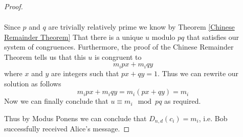 \begin{definition}
\begin{proof}
\begin{itemize}
\begin{align*}
                        \end{align*}
                        Since $p$ and $q$ are trivially relatively prime we know by Theorem
                        \ref{Chinese Remainder Theorem} That there is a unique $u$ modulo
                        $pq$ that satisfies our system of congruences. Furthermore, the proof
                        of the Chinese Remainder Theorem tells us that this $u$ is congruent to
                        \[
                            m_ipx + m_iqy
                        \]
                        where $x$ and $y$ are integers such that $px + qy = 1$. Thus we can
                        rewrite our solution as follows
                        \[
                            m_ipx + m_iqy = m_i(px + qy) = m_i
                        \]
                        Now we can finally conclude that $u \equiv m_i \mod pq$ as required. \QED
                \end{itemize}
                Thus by Modus Ponens we can conclude that $D_{n, d}(c_i) = m_i$, i.e. Bob successfully
                received Alice's message. \QED
            \end{proof}
        \end{definition}
